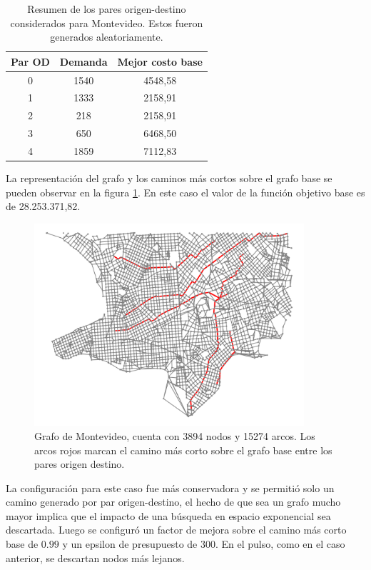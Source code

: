 \documentclass{article}
\begin{document}
  \begin{table}[h!]
    \centering
    \begin{tabular}{ccc}
      \toprule
      Par OD & Demanda & Mejor costo base \\
      \midrule
      0 & 1540 & 4548,58 \\
      1 & 1333 & 2158,91 \\
      2 & 218 & 2158,91 \\
      3 & 650 & 6468,50 \\
      4 & 1859 & 7112,83 \\
      \bottomrule
    \end{tabular}
    \caption{Resumen de los pares origen-destino considerados para Montevideo. Estos fueron generados aleatoriamente.}\label{table:odsmontevideo}
  \end{table}

  La representación del grafo y los caminos más cortos sobre el grafo base se pueden observar en la figura \ref{montevideo}. En este caso el valor de la función objetivo base es de 28.253.371,82.

  \begin{figure}[h!]
    \centering
    \includegraphics[width=10cm]{imgs/mdeo_large_base.png}
    \caption{Grafo de Montevideo, cuenta con 3894 nodos y 15274 arcos. Los arcos rojos marcan el camino más corto sobre el grafo base entre los pares origen destino.}
    \label{montevideo}
  \end{figure}

  La configuración para este caso fue más conservadora y se permitió solo un camino generado por par origen-destino, el hecho de que sea un grafo mucho mayor implica que el impacto de una búsqueda en espacio exponencial sea descartada. Luego se configuró un factor de mejora sobre el camino más corto base de $0.99$ y un epsilon de presupuesto de 300. En el pulso, como en el caso anterior, se descartan nodos más lejanos.
\end{document}
